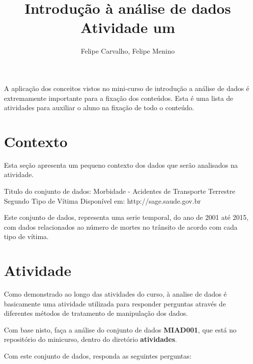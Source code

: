 \documentclass[12pt]{article}
\title{Introdução à análise de dados\\ Atividade um}
\author{Felipe Carvalho\inst{1}, Felipe Menino\inst{1}}
\begin{document}
 

\maketitle

     
\begin{resumo} 
    A aplicação dos conceitos vistos no mini-curso de introdução a análise de dados é extremamente importante para a fixação dos conteúdos. Esta é uma lista de atividades para auxiliar o aluno na fixação de todo o conteúdo.
\end{resumo}

\section{Contexto}

Esta seção apresenta um pequeno contexto dos dados que serão analisados na atividade.

Titulo do conjunto de dados: Morbidade - Acidentes de Transporte Terrestre Segundo Tipo de Vítima
Disponível em: http://sage.saude.gov.br

Este conjunto de dados, representa uma serie temporal, do ano de 2001 até 2015, com dados relacionados ao número de mortes no trânsito de acordo com cada tipo de vítima.

\section{Atividade}

Como demonstrado ao longo das atividades do curso, à analise de dados é basicamente uma atividade utilizada para responder perguntas através de diferentes métodos de tratamento de manipulação dos dados.

Com base nisto, faça a análise do conjunto de dados \textbf{MIAD001}, que está no repositório do minicurso, dentro do diretório \textbf{atividades}.

Com este conjunto de dados, responda as seguintes perguntas:
\end{document}
